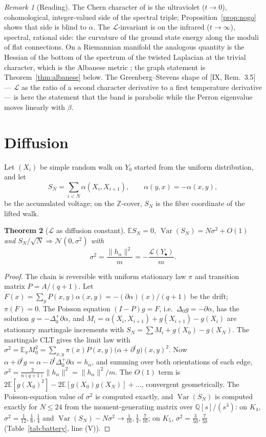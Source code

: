 \documentclass[11pt]{amsart}
\numberwithin{equation}{section}
\newtheorem{theorem}{Theorem}[section]
\theoremstyle{definition}
\theoremstyle{remark}
\newtheorem{remark}[theorem]{Remark}
\newcommand{\Z}{\mathbb{Z}}
\newcommand{\Q}{\mathbb{Q}}
\newcommand{\cL}{\mathcal{L}}
\newcommand{\Var}{\operatorname{Var}}
\begin{document}
\begin{remark}[Reading]\label{rem:reading}
The Chern character of \cite{JLO,Co} is the ultraviolet ($t\to0$), cohomological, integer-valued
side of the spectral triple; Proposition~\ref{prop:nogo} shows that side is blind to
$\alpha$. The $\cL$-invariant is on the infrared ($t\to\infty$), spectral, rational side:
the curvature of the ground state energy along the moduli of flat connections. On a
Riemannian manifold the analogous quantity is the Hessian of the bottom of the spectrum of
the twisted Laplacian at the trivial character, which is the Albanese metric
\cite{KS1}; the graph statement is Theorem~\ref{thm:albanese} below. The Greenberg--Stevens
shape of [IX, Rem.~3.5] --- $\cL$ as the ratio of a second character derivative to a first
temperature derivative --- is here the statement that the band is parabolic while the
Perron eigenvalue moves linearly with $\beta$.
\end{remark}

\section{Diffusion}\label{sec:diffusion}

Let $(X_i)$ be simple random walk on $Y_0$ started from the uniform distribution, and let
\[
S_N=\sum_{i<N}\alpha(X_i,X_{i+1}),\qquad \alpha(y,x)=-\alpha(x,y),
\]
be the accumulated voltage; on the $\Z$-cover, $S_N$ is the fibre coordinate of the lifted
walk.

\begin{theorem}[$\cL$ as diffusion constant]\label{thm:diffusion}
$\mathbb E S_N=0$, $\Var(S_N)=N\sigma^{2}+O(1)$ and $S_N/\sqrt N\Rightarrow\mathcal N(0,\sigma^{2})$
with
\[
\sigma^{2}=\frac{\|h_\alpha\|^{2}}{m}=-\frac{\cL(Y_\bullet)}{m}.
\]
\end{theorem}

\begin{proof}
The chain is reversible with uniform stationary law $\pi$ and transition matrix
$P=A/(q{+}1)$. Let $F(x)=\sum_yP(x,y)\alpha(x,y)=-(\partial\alpha)(x)/(q{+}1)$ be the
drift; $\pi(F)=0$. The Poisson equation $(I-P)g=F$, i.e.\ $\Delta_0g=-\partial\alpha$, has
the solution $g=-\Delta_0^{+}\partial\alpha$, and $M_i=\alpha(X_i,X_{i+1})+g(X_{i+1})-g(X_i)$
are stationary martingale increments with $S_N=\sum M_i+g(X_0)-g(X_N)$. The martingale
CLT gives the limit law with $\sigma^{2}=\mathbb E_\pi M_0^{2}=\sum_{x,y}\pi(x)P(x,y)
\bigl(\alpha+\partial^{t}g\bigr)(x,y)^{2}$. Now $\alpha+\partial^{t}g=\alpha-\partial^{t}\Delta_0^{+}\partial\alpha
=h_\alpha$, and summing over both orientations of each edge,
$\sigma^{2}=\frac{2}{n(q+1)}\|h_\alpha\|^{2}=\|h_\alpha\|^{2}/m$. The $O(1)$ term is
$2\mathbb E[g(X_0)^2]-2\mathbb E[g(X_0)g(X_N)]+\dots$, convergent geometrically. The
Poisson-equation value of $\sigma^{2}$ is computed exactly, and $\Var(S_N)$ is computed
exactly for $N\le24$ from the moment-generating matrix over $\Q[s]/(s^{3})$: on $K_4$,
$\sigma^{2}=\frac1{12},\frac16,\frac14$ and $\Var(S_N)-N\sigma^{2}\to\frac1{16},\frac14,\frac7{16}$;
on $K_5$, $\sigma^{2}=\frac3{50},\frac7{50}$ (Table~\ref{tab:battery}, line (V)).
\end{proof}
\end{document}
